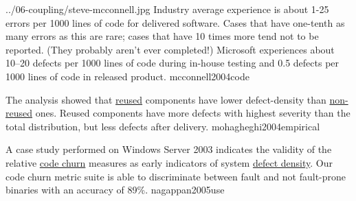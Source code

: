 \documentclass{article}
\begin{document}

\qte
  {../06-coupling/steve-mcconnell.jpg}
  {Industry average experience is about 1-25 errors per 1000 lines of code for delivered software. Cases that have one-tenth as many errors as this are rare; cases that have 10 times more tend not to be reported. (They probably aren't ever completed!) Microsoft experiences about 10–20 defects per 1000 lines of code during in-house testing and 0.5 defects per 1000 lines of code in released product.}
  {mcconnell2004code}

  {The analysis showed that \ul{reused} components have lower defect-density than \ul{non-reused} ones. Reused components have more defects with highest severity than the total distribution, but less defects after delivery.}
  {mohagheghi2004empirical}

  {A case study performed on Windows Server 2003 indicates the validity of the relative \ul{code churn} measures as early indicators of system \ul{defect density}. Our code churn metric suite is able to discriminate between fault and not fault-prone binaries with an accuracy of 89\%.}
  {nagappan2005use}
\end{document}
